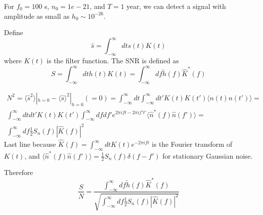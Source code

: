 \documentclass[12pt, a4paper]{article}
\theoremstyle{plain} %
\theoremstyle{definition} %
\begin{document}
For $f_0 = 100$ s, $n_0 = 1e-21$, and $T = 1$ year, we can detect a signal with amplitude as small as $h_0 \sim 10^{-26}$.

Define 
\begin{equation}
    \hat{s} = \int_{-\infty}^{\infty}dt s(t) K(t)
\end{equation}
where $K(t)$ is the filter function. The SNR is defined as
\begin{equation}
    S = \int_{-\infty}^{\infty} dt h(t) K(t) = \int_{-\infty}^{\infty} df \tilde{h}(f) \hat{K}^\ast(f)
\end{equation}

\begin{align}
    N^2= \langle \hat{s}^2 \rangle|_{h=0} -\langle \hat{s} \rangle^2|_{h=0} (=0) =  \int_{-\infty}^{\infty} dt \int_{-\infty}^{\infty} dt' K(t) K(t') \langle n(t) n(t') \rangle = \\ \nonumber
    \int_{-\infty}^{\infty} dt dt'K(t) K(t') \int_{-\infty}^{\infty} df df'e^{2\pi ift - 2\pi if't' }\langle \hat{n}^\ast(f)\hat{n}(f') \rangle =  \\ \nonumber
    \int_{-\infty}^{\infty}df \frac{1}{2} S_n(f) |\hat{K}(f)|^2
\end{align}
Last line because $\hat{K}(f) = \int_{-\infty}^{\infty} dt K(t) e^{-2\pi i f t}$ is the Fourier transform of $K(t)$, and $\langle \hat{n}^\ast(f)\hat{n}(f') \rangle = \frac{1}{2} S_n(f) \delta(f-f')$ for stationary Gaussian noise.

Therefore
\begin{equation}
    \frac{S}{N} = \frac{\int_{-\infty}^{\infty} df \tilde{h}(f) \hat{K}^\ast(f)}{\sqrt{\int_{-\infty}^{\infty} df \frac{1}{2} S_n(f) |\hat{K}(f)|^2}}
\end{equation}
\end{document}
